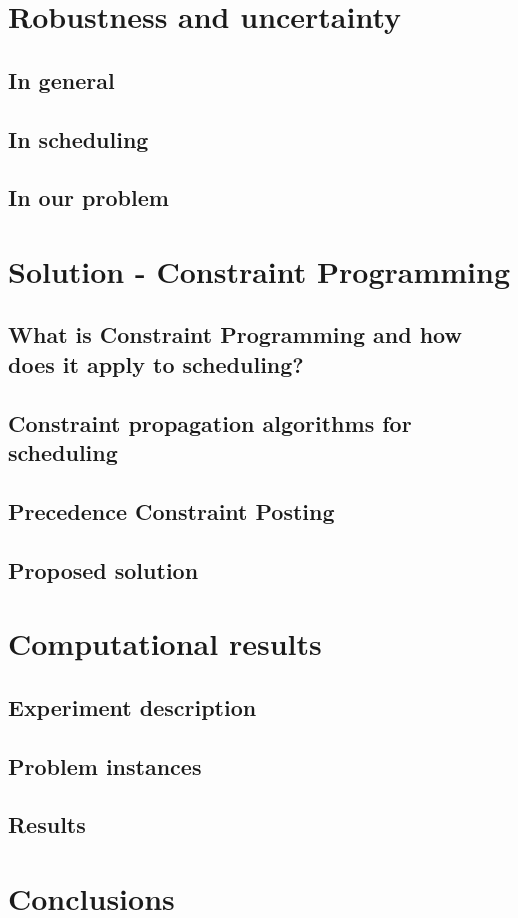 \documentclass{article}
\theoremstyle{definition}
\begin{document}
\section{Robustness and uncertainty}

\subsection{In general}

\subsection{In scheduling}

\subsection{In our problem}




\section{Solution - Constraint Programming}

\subsection{What is Constraint Programming and how does it apply to scheduling?}

\subsection{Constraint propagation algorithms for scheduling}

\subsection{Precedence Constraint Posting}

\subsection{Proposed solution}


\section{Computational results}

\subsection{Experiment description}

\subsection{Problem instances}

\subsection{Results}


\section{Conclusions}





\end{document}
